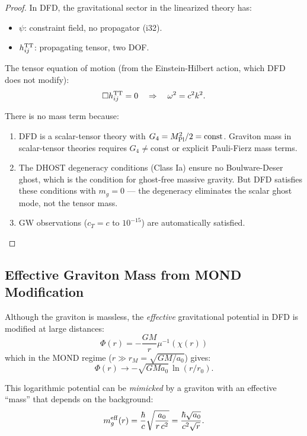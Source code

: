 \documentclass[11pt,a4paper]{article}
\begin{document}
\begin{proof}
In DFD, the gravitational sector in the linearized theory has:
\begin{itemize}
\item $\psi$: constraint field, no propagator (i32).
\item $h_{ij}^{\rm TT}$: propagating tensor, two DOF.
\end{itemize}

The tensor equation of motion (from the Einstein-Hilbert action, which DFD does not modify):
\begin{equation}
\Box h_{ij}^{\rm TT} = 0 \quad \Rightarrow \quad \omega^2 = c^2 k^2.
\end{equation}

There is no mass term because:
\begin{enumerate}
\item DFD is a scalar-tensor theory with $G_4 = M_{\rm Pl}^2/2 = \text{const}$. Graviton mass in scalar-tensor theories requires $G_4 \neq \text{const}$ or explicit Pauli-Fierz mass terms.
\item The DHOST degeneracy conditions (Class Ia) ensure no Boulware-Deser ghost, which is the condition for ghost-free massive gravity. But DFD satisfies these conditions with $m_g = 0$ --- the degeneracy eliminates the scalar ghost mode, not the tensor mass.
\item GW observations ($c_T = c$ to $10^{-15}$) are automatically satisfied.
\end{enumerate}
\end{proof}

\subsection{Effective Graviton Mass from MOND Modification}

Although the graviton is massless, the \emph{effective} gravitational potential in DFD is modified at large distances:
\begin{equation}
\Phi(r) = -\frac{GM}{r}\mu^{-1}(\chi(r))
\end{equation}
which in the MOND regime ($r \gg r_M = \sqrt{GM/a_0}$) gives:
\begin{equation}
\Phi(r) \to -\sqrt{GMa_0}\,\ln(r/r_0).
\end{equation}

This logarithmic potential can be \emph{mimicked} by a graviton with an effective ``mass'' that depends on the background:
\begin{equation}
m_g^{\rm eff}(r) = \frac{\hbar}{c}\sqrt{\frac{a_0}{r\,c^2}} = \frac{\hbar\sqrt{a_0}}{c^2\sqrt{r}}.
\end{equation}
\end{document}
